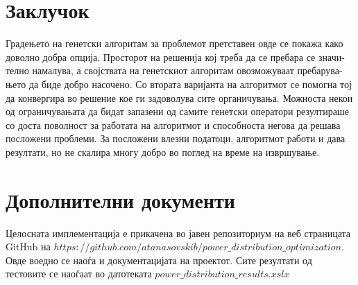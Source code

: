 \documentclass{article}
\begin{document}
\section{Заклучок}
Градењето на генетски алгоритам за проблемот претставен овде се покажа како доволно добра опција. Просторот на решенија кој треба да се пребара се значи-телно намалува, а својствата на генетскиот алгоритам овозможуваат пребарува-њето да биде добро насочено. Со втората варијанта на алгоритмот се помогна тој да конвергира во решение кое ги задоволува сите органичувања. Можноста некои од ограничувањата да бидат запазени од самите генетски оператори резултираше со доста поволност за работата на алгоритмот и способноста негова да решава посложени проблеми. За посложени влезни податоци, алгоритмот работи и дава резултати, но не скалира многу добро во поглед на време на извршување.
 
\section{Дополнителни документи}
\label{sec_apendix}
Целосната имплементација е прикачена во јавен репозиториум на веб страницата GitHub на $https://github.com/atanasovskib/power\_distribution\_optimization$. Овде воедно се наоѓа и документацијата на проектот. Сите резултати од тестовите се наоѓаат во датотеката $power\_distribution\_results.xslx$
%
%
%
\end{document}
